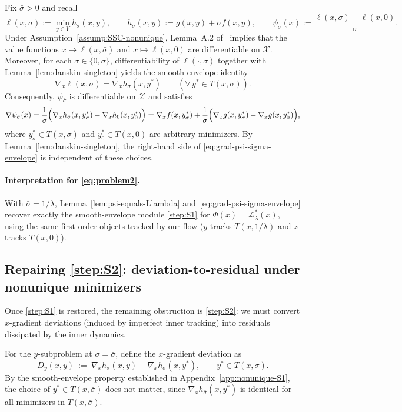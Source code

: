 \documentclass{article}
\newcommand{\1}{\mathbf{1}}
\begin{document}
Fix $\bar\sigma>0$ and recall
\[
\ell(x,\sigma):=\min_{y\in Y} h_\sigma(x,y),
\qquad
h_\sigma(x,y):=g(x,y)+\sigma f(x,y),
\qquad
\psi_\sigma(x):=\frac{\ell(x,\sigma)-\ell(x,0)}{\sigma}.
\]
Under Assumption~\ref{assump:SSC-nonunique}, Lemma~A.2 of~\cite{kwon2023penalty} implies that the value functions
$x\mapsto \ell(x,\bar\sigma)$ and $x\mapsto \ell(x,0)$ are differentiable on $\mathcal X$.
Moreover, for each $\sigma\in\{0,\bar\sigma\}$, differentiability of $\ell(\cdot,\sigma)$ together with
Lemma~\ref{lem:danskin-singleton} yields the smooth envelope identity
\[
\nabla_x \ell(x,\sigma)=\nabla_x h_\sigma(x,y^*)
\qquad(\forall\,y^*\in T(x,\sigma)).
\]
Consequently, $\psi_{\bar\sigma}$ is differentiable on $\mathcal X$ and satisfies
\begin{equation}\label{eq:grad-psi-sigma-envelope}
\nabla \psi_{\bar\sigma}(x)
=\frac{1}{\bar\sigma}\Bigl(\nabla_x h_{\bar\sigma}(x,y_{\bar\sigma}^*)-\nabla_x h_{0}(x,y_{0}^*)\Bigr)
=\nabla_x f(x,y_{\bar\sigma}^*)+\frac{1}{\bar\sigma}\Bigl(\nabla_x g(x,y_{\bar\sigma}^*)-\nabla_x g(x,y_{0}^*)\Bigr),
\end{equation}
where $y_{\bar\sigma}^*\in T(x,\bar\sigma)$ and $y_0^*\in T(x,0)$ are arbitrary minimizers.
By Lemma~\ref{lem:danskin-singleton}, the right-hand side of \eqref{eq:grad-psi-sigma-envelope} is independent of these choices.


\paragraph{Interpretation for \ref{eq:problem2}.}
With $\bar\sigma=1/\lambda$, Lemma~\ref{lem:psi-equals-Llambda} and~\eqref{eq:grad-psi-sigma-envelope} recover exactly the smooth-envelope module \ref{step:S1}
for $\Phi(x)=\mathcal L_\lambda^*(x)$, using the same first-order objects tracked by our flow
($y$ tracks $T(x,1/\lambda)$ and $z$ tracks $T(x,0)$).

\subsection{Repairing \ref{step:S2}: deviation-to-residual under nonunique minimizers}\label{app:nonunique-S2}
Once \ref{step:S1} is restored, the remaining obstruction is \ref{step:S2}: we must convert $x$-gradient deviations
(induced by imperfect inner tracking) into residuals dissipated by the inner dynamics.

For the $y$-subproblem at $\sigma=\bar\sigma$, define the $x$-gradient deviation as
\[
D_y(x,y)\ :=\ \nabla_x h_{\bar\sigma}(x,y)-\nabla_x h_{\bar\sigma}(x,y^*),
\qquad y^*\in T(x,\bar\sigma).
\]
By the smooth-envelope property established in Appendix~\ref{app:nonunique-S1}, the choice of $y^*\in T(x,\bar\sigma)$ does not matter, since $\nabla_x h_{\bar\sigma}(x,y^*)$ is identical for all minimizers in $T(x,\bar\sigma)$.
\end{document}
